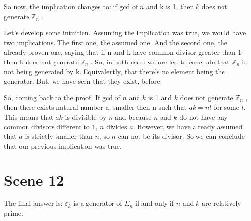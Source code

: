 \documentclass[12pt]{article}
\newcommand{\e}{\varepsilon}
\newcommand{\zn}{$\mathbb{Z}_n\;$}
\newcommand{\mybox}[1]{\colorbox{Goldenrod2}{#1}}
\begin{document}
    So now, the implication changes to: if gcd of $n$ and k is 1, then $k$ does not generate \zn.
    
    Let's develop some intuition. Assuming the implication was true, we would have two implications. The first one, the assumed one.  And the second one, the already proven one, saying that if n and k have common divisor greater than 1 then k does not generate \zn. So, in both cases we are led to conclude that \zn is not being generated by k. Equivalently, that there's no element being the generator. But, we have seen that they exist, before.

    So, coming back to the proof. If gcd of $n$ and $k$ is 1 and $k$ does not generate \zn, then there exists natural number a, smaller then n such that $ak=nl$ for some $l$. This means that $ak$ is divisible by $n$ and because $n$ and $k$ do not have any common divisors different to 1, $n$ divides $a$. However, we have already assumed that $a$ is strictly smaller than $n$, so $n$ can not be its divisor. So we can conclude that our previous implication was true.

\section*{\mybox{Scene 12}}
     The final answer is: $\e_k$ is a generator of $E_n$ if and only if $n$ and $k$ are relatively prime.
    
\end{document}
